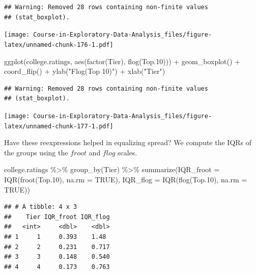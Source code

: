 \documentclass[
]{book}
\newenvironment{Shaded}{\begin{snugshade}}{\end{snugshade}}
\newcommand{\AttributeTok}[1]{\textcolor[rgb]{0.77,0.63,0.00}{#1}}
\newcommand{\ConstantTok}[1]{\textcolor[rgb]{0.00,0.00,0.00}{#1}}
\newcommand{\FloatTok}[1]{\textcolor[rgb]{0.00,0.00,0.81}{#1}}
\newcommand{\FunctionTok}[1]{\textcolor[rgb]{0.00,0.00,0.00}{#1}}
\newcommand{\NormalTok}[1]{#1}
\newcommand{\SpecialCharTok}[1]{\textcolor[rgb]{0.00,0.00,0.00}{#1}}
\newcommand{\StringTok}[1]{\textcolor[rgb]{0.31,0.60,0.02}{#1}}
\begin{document}
\begin{verbatim}
## Warning: Removed 28 rows containing non-finite values
## (stat_boxplot).
\end{verbatim}

\texttt{[image: Course-in-Exploratory-Data-Analysis\_files/figure-latex/unnamed-chunk-176-1.pdf]}

\begin{Shaded}
\begin{Highlighting}[]
\FunctionTok{ggplot}\NormalTok{(college.ratings,}
       \FunctionTok{aes}\NormalTok{(}\FunctionTok{factor}\NormalTok{(Tier), }\FunctionTok{flog}\NormalTok{(Top}\FloatTok{.10}\NormalTok{))) }\SpecialCharTok{+}
  \FunctionTok{geom\_boxplot}\NormalTok{() }\SpecialCharTok{+} \FunctionTok{coord\_flip}\NormalTok{() }\SpecialCharTok{+}
  \FunctionTok{ylab}\NormalTok{(}\StringTok{"Flog(Top 10)"}\NormalTok{) }\SpecialCharTok{+} \FunctionTok{xlab}\NormalTok{(}\StringTok{"Tier"}\NormalTok{)}
\end{Highlighting}
\end{Shaded}

\begin{verbatim}
## Warning: Removed 28 rows containing non-finite values
## (stat_boxplot).
\end{verbatim}

\texttt{[image: Course-in-Exploratory-Data-Analysis\_files/figure-latex/unnamed-chunk-177-1.pdf]}

Have these reexpressions helped in equalizing spread? We compute the IQRs of the groups using the \(froot\) and \(flog\) scales.

\begin{Shaded}
\begin{Highlighting}[]
\NormalTok{college.ratings }\SpecialCharTok{\%\textgreater{}\%} 
  \FunctionTok{group\_by}\NormalTok{(Tier) }\SpecialCharTok{\%\textgreater{}\%} 
  \FunctionTok{summarize}\NormalTok{(}\AttributeTok{IQR\_froot =} \FunctionTok{IQR}\NormalTok{(}\FunctionTok{froot}\NormalTok{(Top}\FloatTok{.10}\NormalTok{), }\AttributeTok{na.rm =} \ConstantTok{TRUE}\NormalTok{),}
            \AttributeTok{IQR\_flog =} \FunctionTok{IQR}\NormalTok{(}\FunctionTok{flog}\NormalTok{(Top}\FloatTok{.10}\NormalTok{), }\AttributeTok{na.rm =} \ConstantTok{TRUE}\NormalTok{))}
\end{Highlighting}
\end{Shaded}

\begin{verbatim}
## # A tibble: 4 x 3
##    Tier IQR_froot IQR_flog
##   <int>     <dbl>    <dbl>
## 1     1     0.393    1.48 
## 2     2     0.231    0.717
## 3     3     0.148    0.540
## 4     4     0.173    0.763
\end{verbatim}
\end{document}
